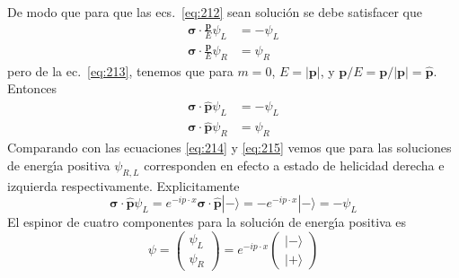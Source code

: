 De modo que para que las ecs.~\eqref{eq:212} sean soluci\'on se debe satisfacer que
\begin{align}
     \boldsymbol{\sigma}\cdot\frac{\mathbf{p}}{E}\psi_L &=-\psi_L\nonumber\\
   \boldsymbol{\sigma}\cdot\frac{\mathbf{p}}{E}\psi_R&=\psi_R
\end{align}
pero de la ec.~\eqref{eq:213}, tenemos que para $m=0$, $E=|\mathbf{p}|$, y $\mathbf{p}/E=\mathbf{p}/|\mathbf{p}|=\hat{\mathbf{p}}$. Entonces
\begin{align}
  \boldsymbol{\sigma}\cdot\hat{\mathbf{p}}\psi_L &=-\psi_L\nonumber\\
  \boldsymbol{\sigma}\cdot\hat{\mathbf{p}}\psi_R&=\psi_R
\end{align}
Comparando con las ecuaciones \eqref{eq:214} y \eqref{eq:215} vemos que para las soluciones de energ\'\i a positiva $\psi_{R,L}$ corresponden en efecto a estado de helicidad derecha e izquierda respectivamente. Explicitamente
\begin{equation}
  \boldsymbol{\sigma}\cdot\hat{\mathbf{p}}\psi_L=e^{-i p\cdot x}\boldsymbol{\sigma}\cdot\hat{\mathbf{p}}|-\rangle=-e^{-i p\cdot x}|-\rangle=-\psi_L
\end{equation}
El espinor de cuatro componentes para la soluci\'on de energ\'\i a positiva es
\begin{equation}
  \psi=\begin{pmatrix}
    \psi_L\\
    \psi_R
  \end{pmatrix}=e^{-i p\cdot x}\begin{pmatrix}
    |-\rangle\\
    |+\rangle
  \end{pmatrix}
\end{equation}

